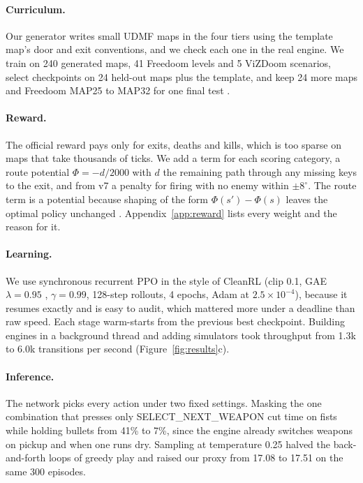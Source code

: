 \documentclass{article}
\begin{document}
\paragraph{Curriculum.} Our generator writes small UDMF maps in the four tiers using the template map's door and exit conventions, and we check each one in the real engine. We train on 240 generated maps, 41 Freedoom levels and 5 ViZDoom scenarios, select checkpoints on 24 held-out maps plus the template, and keep 24 more maps and Freedoom MAP25 to MAP32 for one final test \citep{cobbe2020procgen}.

\paragraph{Reward.} The official reward pays only for exits, deaths and kills, which is too sparse on maps that take thousands of ticks. We add a term for each scoring category, a route potential $\Phi=-d/2000$ with $d$ the remaining path through any missing keys to the exit, and from v7 a penalty for firing with no enemy within $\pm8^\circ$. The route term is a potential because shaping of the form $\Phi(s')-\Phi(s)$ leaves the optimal policy unchanged \citep{ng1999pbrs}. Appendix~\ref{app:reward} lists every weight and the reason for it.

\paragraph{Learning.} We use synchronous recurrent PPO in the style of CleanRL \citep{huang2022cleanrl} (clip 0.1, GAE $\lambda=0.95$ \citep{schulman2016gae}, $\gamma=0.99$, 128-step rollouts, 4 epochs, Adam at $2.5\times10^{-4}$), because it resumes exactly and is easy to audit, which mattered more under a deadline than raw speed. Each stage warm-starts from the previous best checkpoint. Building engines in a background thread and adding simulators took throughput from 1.3k to 6.0k transitions per second (Figure~\ref{fig:results}c).

\paragraph{Inference.} The network picks every action under two fixed settings. Masking the one combination that presses only SELECT\_NEXT\_WEAPON cut time on fists while holding bullets from 41\% to 7\%, since the engine already switches weapons on pickup and when one runs dry. Sampling at temperature 0.25 halved the back-and-forth loops of greedy play and raised our proxy from 17.08 to 17.51 on the same 300 episodes.
\end{document}

